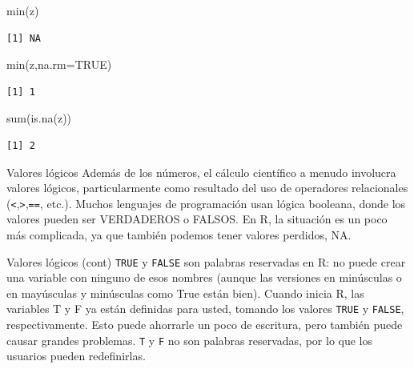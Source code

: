 \documentclass[
  ignorenonframetext,
  aspectratio=169,
  spanish,
]{beamer}
\newenvironment{Shaded}{\begin{snugshade}}{\end{snugshade}}
\newcommand{\AttributeTok}[1]{\textcolor[rgb]{0.40,0.45,0.13}{#1}}
\newcommand{\ConstantTok}[1]{\textcolor[rgb]{0.56,0.35,0.01}{#1}}
\newcommand{\FunctionTok}[1]{\textcolor[rgb]{0.28,0.35,0.67}{#1}}
\newcommand{\NormalTok}[1]{\textcolor[rgb]{0.00,0.23,0.31}{#1}}
\begin{document}
\begin{frame}[fragile]{}
\label{section-12}
\begin{Shaded}
\begin{Highlighting}[]
\FunctionTok{min}\NormalTok{(z)}
\end{Highlighting}
\end{Shaded}

\begin{verbatim}
[1] NA
\end{verbatim}

\begin{Shaded}
\begin{Highlighting}[]
\FunctionTok{min}\NormalTok{(z,}\AttributeTok{na.rm=}\ConstantTok{TRUE}\NormalTok{) }
\end{Highlighting}
\end{Shaded}

\begin{verbatim}
[1] 1
\end{verbatim}

\begin{Shaded}
\begin{Highlighting}[]
\FunctionTok{sum}\NormalTok{(}\FunctionTok{is.na}\NormalTok{(z))}
\end{Highlighting}
\end{Shaded}

\begin{verbatim}
[1] 2
\end{verbatim}
\end{frame}

\begin{frame}[fragile]{Valores lógicos}
\label{valores-luxf3gicos}
Además de los números, el cálculo científico a menudo involucra valores
lógicos, particularmente como resultado del uso de operadores
relacionales (\texttt{\textless{}},\texttt{\textgreater{}},\texttt{==},
etc.). Muchos lenguajes de programación usan lógica booleana, donde los
valores pueden ser VERDADEROS o FALSOS. En R, la situación es un poco
más complicada, ya que también podemos tener valores perdidos, NA.
\end{frame}

\begin{frame}[fragile]{Valores lógicos (cont)}
\label{valores-luxf3gicos-cont}
\texttt{TRUE} y \texttt{FALSE} son palabras reservadas en R: no puede
crear una variable con ninguno de esos nombres (aunque las versiones en
minúsculas o en mayúsculas y minúsculas como True están bien). Cuando
inicia R, las variables T y F ya están definidas para usted, tomando los
valores \texttt{TRUE} y \texttt{FALSE}, respectivamente. Esto puede
ahorrarle un poco de escritura, pero también puede causar grandes
problemas. \texttt{T} y \texttt{F} no son palabras reservadas, por lo
que los usuarios pueden redefinirlas.
\end{frame}
\end{document}
